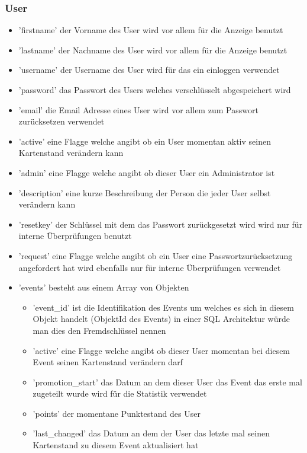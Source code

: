 			\subsubsection{User}
				\begin{itemize}
					\item 'firstname' der Vorname des User wird vor allem für die Anzeige benutzt
					\item 'lastname' der Nachname des User wird vor allem für die Anzeige benutzt
					\item 'username' der Username des User wird für das ein einloggen verwendet
					\item 'password' das Passwort des Users welches verschlüsselt abgespeichert wird
					\item 'email' die Email Adresse eines User wird vor allem zum Passwort zurücksetzen verwendet
					\item 'active' eine Flagge welche angibt ob ein User momentan aktiv seinen Kartenstand verändern kann
					\item 'admin' eine Flagge welche angibt ob dieser User ein Administrator ist
					\item 'description' eine kurze Beschreibung der Person die jeder User selbst verändern kann
					\item 'resetkey' der Schlüssel mit dem das Passwort zurückgesetzt wird wird nur für interne Überprüfungen benutzt
					\item 'request' eine Flagge welche angibt ob ein User eine Passwortzurücksetzung angefordert hat wird ebenfalls nur für interne Überprüfungen verwendet
					\item 'events' besteht aus einem Array von Objekten
					\begin{itemize}
						\item 'event\_id' ist die Identifikation des Events um welches es sich in diesem Objekt handelt (ObjektId des Events) in einer SQL Architektur würde man dies den Fremdschlüssel nennen
						\item 'active' eine Flagge welche angibt ob dieser User momentan bei diesem Event seinen Kartenstand verändern darf
						\item 'promotion\_start' das Datum an dem dieser User das Event das erste mal zugeteilt wurde wird für die Statistik verwendet
						\item 'points' der momentane Punktestand des User
						\item 'last\_changed' das Datum an dem der User das letzte mal seinen Kartenstand zu diesem Event aktualisiert hat

\end{itemize}
\end{itemize}
